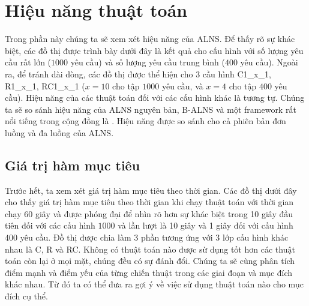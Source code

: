 \section{Hiệu năng thuật toán}
\label{sec:performance}
Trong phần này chúng ta sẽ xem xét hiệu năng của ALNS. Để thấy rõ sự khác biệt, các đồ thị được trình bày dưới đây là kết quả cho cấu hình với số lượng yêu cầu rất lớn ($1000$ yêu cầu) và số lượng yêu cầu trung bình ($400$ yêu cầu). Ngoài ra, để tránh dài dòng, các đồ thị được thể hiện cho 3 cầu hình C1\_x\_1, R1\_x\_1, RC1\_x\_1 ($x = 10$ cho tập $1000$ yêu cầu, và $x=4$ cho tập $400$ yêu cầu). Hiệu năng của các thuật toán đối với các cấu hình khác là tương tự. Chúng ta sẽ so sánh hiệu năng của ALNS nguyên bản, B-ALNS và một framework rất nổi tiếng trong cộng đồng là . Hiệu năng được so sánh cho cả phiên bản đơn luồng và đa luồng của ALNS.

\subsection{Giá trị hàm mục tiêu}

Trước hết, ta xem xét giá trị hàm mục tiêu theo thời gian. Các đồ thị dưới đây cho thấy giá trị hàm mục tiêu theo thời gian khi chạy thuật toán với thời gian chạy 60 giây và được phóng đại để nhìn rõ hơn sự khác biệt trong 10 giây đầu tiên đối với các cấu hình $1000$ và lần lượt là 10 giây và 1 giây đối với cấu hình $400$ yêu cầu. Đồ thị được chia làm 3 phần tương ứng với 3 lớp cấu hình khác nhau là C, R và RC. Không có thuật toán nào được sừ dụng tốt hơn các thuật toán còn lại ở mọi mặt, chúng đều có sự đánh đổi. Chúng ta sẽ cùng phân tích điểm mạnh và điểm yếu của từng chiến thuật trong các giai đoạn và mục đích khác nhau. Từ đó ta có thể đưa ra gợi ý về việc sử dụng thuật toán nào cho mục đích cụ thể.

